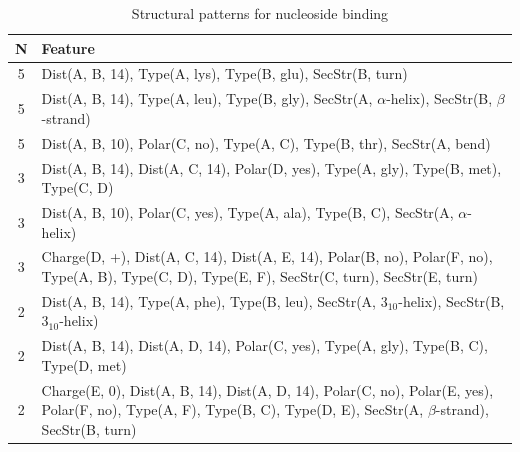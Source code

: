 \documentclass[11pt,twoside,a4paper]{book}
\begin{document}
\begin{table}\begin{tabularx}{\textwidth}{cX}\textbf{N} & \textbf{Feature} \\ \hline  
5 & Dist(A, B, 14),  Type(A, lys), Type(B, glu), SecStr(B, turn)\\ \hline 
5 & Dist(A, B, 14),  Type(A, leu), Type(B, gly), SecStr(A, $\alpha$-helix), SecStr(B, $\beta$-strand)\\ \hline 
5 & Dist(A, B, 10), Polar(C, no),  Type(A, C), Type(B, thr), SecStr(A, bend)\\ \hline 
3 & Dist(A, B, 14), Dist(A, C, 14), Polar(D, yes),  Type(A, gly), Type(B, met),  \newline Type(C, D)\\ \hline 
3 & Dist(A, B, 10), Polar(C, yes),  Type(A, ala), Type(B, C), SecStr(A, $\alpha$-helix)\\ \hline 
3 & Charge(D, +), Dist(A, C, 14), Dist(A, E, 14), Polar(B, no), Polar(F, no),  \newline Type(A, B), Type(C, D), Type(E, F), SecStr(C, turn), SecStr(E, turn)\\ \hline 
2 & Dist(A, B, 14),  Type(A, phe), Type(B, leu), SecStr(A, $3_{10}$-helix), SecStr(B, $3_{10}$-helix)\\ \hline 
2 & Dist(A, B, 14), Dist(A, D, 14), Polar(C, yes),  Type(A, gly), Type(B, C), \newline Type(D, met)\\ \hline 
2 & Charge(E, 0), Dist(A, B, 14), Dist(A, D, 14), Polar(C, no), Polar(E, yes), \newline Polar(F, no),  Type(A, F), Type(B, C), Type(D, E), SecStr(A, $\beta$-strand), \newline SecStr(B, turn)\\ \hline 
 \end{tabularx}\caption{Structural patterns for nucleoside binding}\label{tab:nucleoside_binding}\end{table}
\end{document}
